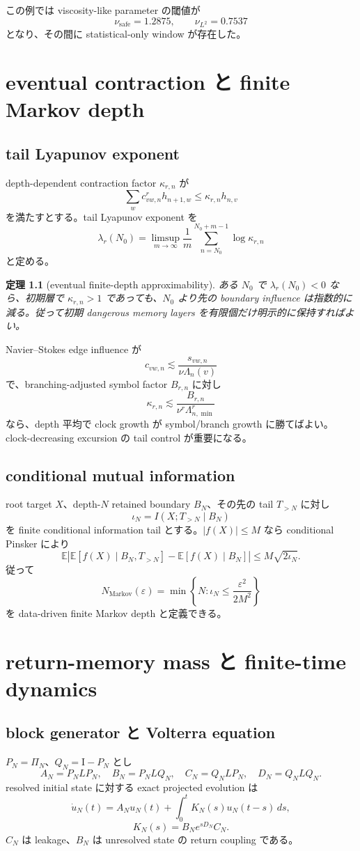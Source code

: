 \documentclass[11pt,a4paper,openany]{book}
\newtheorem{theorem}[definition]{定理}
\numberwithin{equation}{chapter}
\newcommand{\E}{\mathbb E}
\newcommand{\Id}{\mathrm I}
\begin{document}
この例では viscosity-like parameter の閾値が
\[
\nu_{\mathrm{safe}}=1.2875,
\qquad
\nu_{L^2}=0.7537
\]
となり、その間に statistical-only window が存在した。

\chapter{eventual contraction と finite Markov depth}
\section{tail Lyapunov exponent}
depth-dependent contraction factor $\kappa_{r,n}$ が
\[
\sum_wc_{vw,n}^rh_{n+1,w}
\le\kappa_{r,n}h_{n,v}
\]
を満たすとする。tail Lyapunov exponent を
\[
\lambda_r(N_0)
=\limsup_{m\to\infty}
\frac1m\sum_{n=N_0}^{N_0+m-1}\log\kappa_{r,n}
\]
と定める。

\begin{theorem}[eventual finite-depth approximability]
ある $N_0$ で $\lambda_r(N_0)<0$ なら、初期層で $\kappa_{r,n}>1$ であっても、$N_0$ より先の boundary influence は指数的に減る。従って初期 dangerous memory layers を有限個だけ明示的に保持すればよい。
\end{theorem}

Navier--Stokes edge influence が
\[
c_{vw,n}
\lesssim\frac{s_{vw,n}}{\nu\Lambda_n(v)}
\]
で、branching-adjusted symbol factor $B_{r,n}$ に対し
\[
\kappa_{r,n}
\lesssim
\frac{B_{r,n}}{\nu^r\Lambda_{n,\min}^r}
\]
なら、depth 平均で clock growth が symbol/branch growth に勝てばよい。clock-decreasing excursion の tail control が重要になる。

\section{conditional mutual information}
root target $X$、depth-$N$ retained boundary $B_N$、その先の tail $T_{>N}$ に対し
\[
\iota_N=I(X;T_{>N}\mid B_N)
\]
を finite conditional information tail とする。$|f(X)|\le M$ なら conditional Pinsker により
\[
\E\left|
\E[f(X)\mid B_N,T_{>N}]
-
\E[f(X)\mid B_N]
\right|
\le M\sqrt{2\iota_N}.
\]
従って
\[
N_{\mathrm{Markov}}(\varepsilon)
=\min\left\{N:\iota_N\le\frac{\varepsilon^2}{2M^2}\right\}
\]
を data-driven finite Markov depth と定義できる。

\chapter{return-memory mass と finite-time dynamics}
\section{block generator と Volterra equation}
$P_N=\Pi_N$、$Q_N=\Id-P_N$ とし
\[
A_N=P_NLP_N,
\quad B_N=P_NLQ_N,
\quad C_N=Q_NLP_N,
\quad D_N=Q_NLQ_N.
\]
resolved initial state に対する exact projected evolution は
\[
\dot u_N(t)
=A_Nu_N(t)+\int_0^tK_N(s)u_N(t-s)\,ds,
\]
\[
K_N(s)=B_Ne^{sD_N}C_N.
\]
$C_N$ は leakage、$B_N$ は unresolved state の return coupling である。
\end{document}
